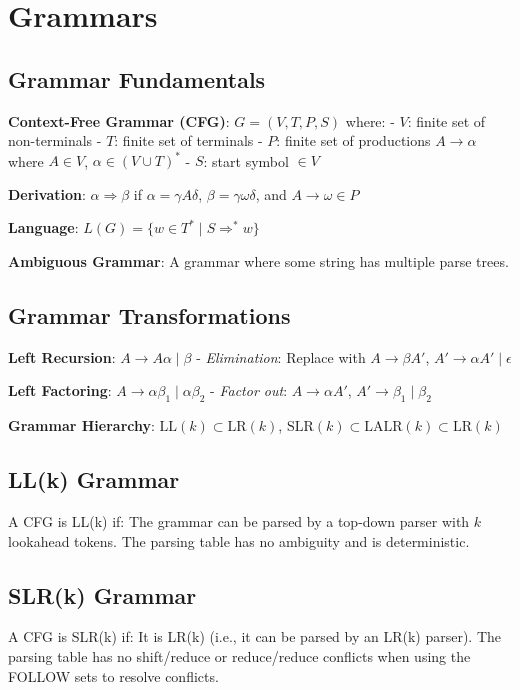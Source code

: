 \section{Grammars}

\subsection{Grammar Fundamentals}
\textbf{Context-Free Grammar (CFG)}: $G = (V, T, P, S)$ where:
- $V$: finite set of non-terminals
- $T$: finite set of terminals  
- $P$: finite set of productions $A \to \alpha$ where $A \in V$, $\alpha \in (V \cup T)^*$
- $S$: start symbol $\in V$

\textbf{Derivation}: $\alpha \Rightarrow \beta$ if $\alpha = \gamma A \delta$, $\beta = \gamma \omega \delta$, and $A \to \omega \in P$

\textbf{Language}: $L(G) = \{w \in T^* \mid S \Rightarrow^* w\}$

\textbf{Ambiguous Grammar}: A grammar where some string has multiple parse trees.

\subsection{Grammar Transformations}
\textbf{Left Recursion}: $A \to A\alpha \mid \beta$
- \textit{Elimination}: Replace with $A \to \beta A'$, $A' \to \alpha A' \mid \epsilon$

\textbf{Left Factoring}: $A \to \alpha\beta_1 \mid \alpha\beta_2$
- \textit{Factor out}: $A \to \alpha A'$, $A' \to \beta_1 \mid \beta_2$

\textbf{Grammar Hierarchy}: $\text{LL}(k) \subset \text{LR}(k)$, $\text{SLR}(k) \subset \text{LALR}(k) \subset \text{LR}(k)$

\subsection{LL(k) Grammar}
A CFG is LL(k) if:
The grammar can be parsed by a top-down parser with $k$ lookahead tokens.
The parsing table has no ambiguity and is deterministic.

\subsection{SLR(k) Grammar}
A CFG is SLR(k) if:
It is LR(k) (i.e., it can be parsed by an LR(k) parser).
The parsing table has no shift/reduce or reduce/reduce conflicts when using the FOLLOW sets to resolve conflicts.


